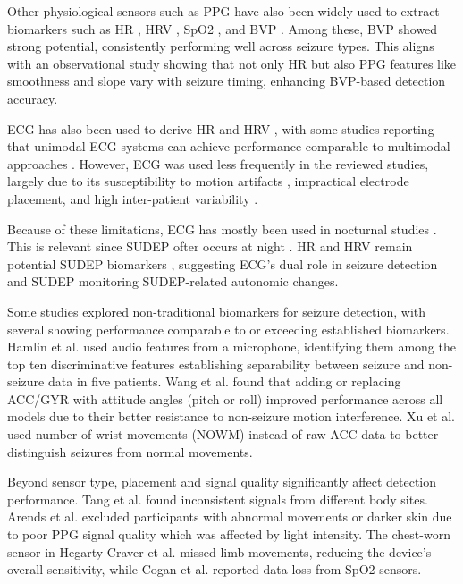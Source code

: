 Other physiological sensors such as PPG have also been widely used to extract biomarkers such as HR \cite{Cogan2017-lg,Nasseri2021-xn,Vakilna2024-hk,Xu2022-tx,Jiang2022-zu,Arends2018-ew}, HRV \cite{Vakilna2024-hk,Jiang2022-zu}, SpO2 \cite{Cogan2017-lg}, and BVP \cite{Yu2023-ss,Nasseri2021-xn,Tang2021-td}. Among these, BVP showed strong potential, consistently performing well across seizure types. This aligns with an observational study \cite{Mohammadpour_Touserkani2020-tk} showing that not only HR but also PPG features like smoothness and slope vary with seizure timing, enhancing BVP-based detection accuracy.

ECG has also been used to derive HR \cite{Hegarty-Craver2021-hk,De_Cooman2018-pq,Van_Andel2017-yx} and HRV \cite{Hegarty-Craver2021-hk}, with some studies reporting that unimodal ECG systems can achieve performance comparable to multimodal approaches \cite{Hegarty-Craver2021-hk,De_Cooman2018-pq}. However, ECG was used less frequently in the reviewed studies, largely due to its susceptibility to motion artifacts \cite{Van_Andel2017-yx}, impractical electrode placement, and high inter-patient variability \cite{Van_Andel2017-yx,De_Cooman2018-pq}.

Because of these limitations, ECG has mostly been used in nocturnal studies \cite{Van_Andel2017-yx,De_Cooman2018-pq}. This is relevant since SUDEP ofter occurs at night \cite{Friedman2022-mo}. HR and HRV remain potential SUDEP biomarkers \cite{Barot2019-nx}, suggesting ECG’s dual role in seizure detection and SUDEP monitoring SUDEP-related autonomic changes.

Some studies explored non-traditional biomarkers for seizure detection, with several showing performance comparable to or exceeding established biomarkers. Hamlin et al. \cite{Hamlin2021-sd} used audio features from a microphone, identifying them among the top ten discriminative features establishing separability between seizure and non-seizure data in five patients. Wang et al. \cite{Wang2025-ql} found that adding or replacing ACC/GYR with attitude angles (pitch or roll) improved performance across all models due to their better resistance to non-seizure motion interference. Xu et al. \cite{Xu2022-tx} used number of wrist movements (NOWM) instead of raw ACC data to better distinguish seizures from normal movements.

Beyond sensor type, placement and signal quality significantly affect detection performance. Tang et al. \cite{Tang2021-td} found inconsistent signals from different body sites. Arends et al. \cite{Arends2018-ew} excluded participants with abnormal movements or darker skin due to poor PPG signal quality which was affected by light intensity. The chest-worn sensor in Hegarty-Craver et al. \cite{Hegarty-Craver2021-hk} missed limb movements, reducing the device's overall sensitivity, while Cogan et al. \cite{Cogan2017-lg} reported data loss from SpO2 sensors.

